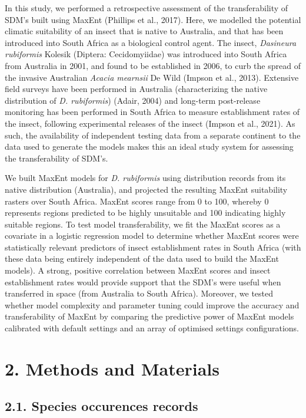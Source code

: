 \documentclass[12pt,]{article}
\begin{document}
In this study, we performed a retrospective assessment of the
transferability of SDM's built using MaxEnt (Phillips et al., 2017).
Here, we modelled the potential climatic suitability of an insect that
is native to Australia, and that has been introduced into South Africa
as a biological control agent. The insect, \emph{Dasineura rubiformis}
Kolesik (Diptera: Cecidomyiidae) was introduced into South Africa from
Australia in 2001, and found to be established in 2006, to curb the
spread of the invasive Australian \emph{Acacia mearnsii} De Wild (Impson
et al., 2013). Extensive field surveys have been performed in Australia
(characterizing the native distribution of \emph{D. rubiformis}) (Adair,
2004) and long-term post-release monitoring has been performed in South
Africa to measure establishment rates of the insect, following
experimental releases of the insect (Impson et al., 2021). As such, the
availability of independent testing data from a separate continent to
the data used to generate the models makes this an ideal study system
for assessing the transferability of SDM's.

We built MaxEnt models for \emph{D. rubiformis} using distribution
records from its native distribution (Australia), and projected the
resulting MaxEnt suitability rasters over South Africa. MaxEnt scores
range from 0 to 100, whereby 0 represents regions predicted to be highly
unsuitable and 100 indicating highly suitable regions. To test model
transferability, we fit the MaxEnt scores as a covariate in a logistic
regression model to determine whether MaxEnt scores were statistically
relevant predictors of insect establishment rates in South Africa (with
these data being entirely independent of the data used to build the
MaxEnt models). A strong, positive correlation between MaxEnt scores and
insect establishment rates would provide support that the SDM's were
useful when transferred in space (from Australia to South Africa).
Moreover, we tested whether model complexity and parameter tuning could
improve the accuracy and transferability of MaxEnt by comparing the
predictive power of MaxEnt models calibrated with default settings and
an array of optimised settings configurations.

\hypertarget{methods-and-materials}{%
\section{2. Methods and Materials}\label{methods-and-materials}}

\hypertarget{species-occurences-records}{%
\subsection{2.1. Species occurences
records}\label{species-occurences-records}}
\end{document}

